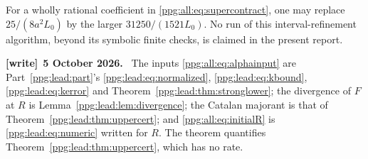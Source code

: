 \documentclass[11pt,letterpaper]{article}
\theoremstyle{remark}\newtheorem{remark}[theorem]{Remark}
\numberwithin{equation}{section}
\newenvironment{writenote}[1][]{\par\smallskip\begingroup\small
 \noindent\textbf{[write]}\if\relax\detokenize{#1}\relax\else~\textbf{#1.}\fi\ }%
 {\par\endgroup\smallskip}
\begin{document}
For a wholly rational coefficient in \eqref{ppg:all:eq:supercontract}, one may replace $25/(8a^2L_0)$ by the larger $31250/(1521L_0)$. No run of this interval-refinement algorithm, beyond its symbolic finite checks, is claimed in the present report.
\begin{writenote}[5 October 2026]
The inputs \eqref{ppg:all:eq:alphainput} are Part~\ref{ppg:lead:part}'s \eqref{ppg:lead:eq:normalized}, \eqref{ppg:lead:eq:kbound}, \eqref{ppg:lead:eq:kerror} and Theorem~\ref{ppg:lead:thm:stronglower}; the divergence of $F$ at $R$ is Lemma~\ref{ppg:lead:lem:divergence}; the Catalan majorant is that of Theorem~\ref{ppg:lead:thm:uppercert}; and \eqref{ppg:all:eq:initialR} is \eqref{ppg:lead:eq:numeric} written for $R$. The theorem quantifies Theorem~\ref{ppg:lead:thm:uppercert}, which has no rate.
\end{writenote}
\end{document}
